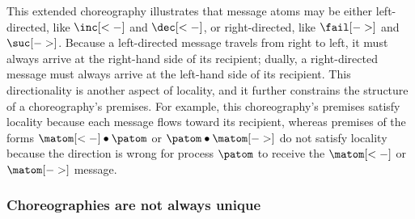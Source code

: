 This extended choreography illustrates that message atoms may be either left-directed, like $\inc[<-]$ and $\dec[<-]$, or right-directed, like $\fail[->]$ and $\suc[->]$.
% 
Because a left-directed message travels from right to left, it must always arrive at the right-hand side of its recipient; dually, a right-directed message must always arrive at the left-hand side of its recipient.
This directionality is another aspect of locality, and it further constrains the structure of a choreography's premises.
For example, this choreography's premises satisfy locality %
because each message flows toward its recipient, whereas premises of the forms $\matom[<-] \fuse \patom$ or $\patom \fuse \matom[->]$ do not satisfy locality %
because the direction is wrong for process $\patom$ to receive the $\matom[<-]$ or $\matom[->]$ message.



\subsubsection{Choreographies are not always unique}\label{sec:mult-chor-are}

